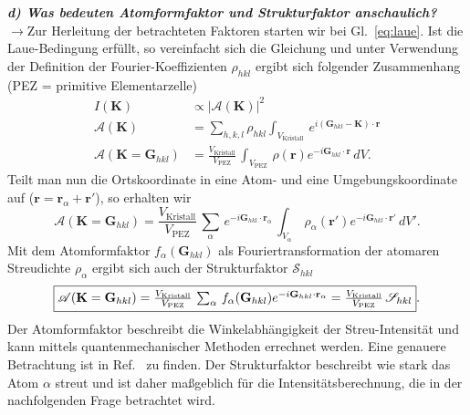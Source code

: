 \textbf{\textit{d) Was bedeuten Atomformfaktor und Strukturfaktor anschaulich?}}\\
$\rightarrow$Zur Herleitung der betrachteten Faktoren starten wir bei Gl.~\eqref{eq:laue}. 
Ist die Laue-Bedingung erfüllt, so vereinfacht sich die Gleichung und unter Verwendung der Definition 
der Fourier-Koeffizienten $\rho_{hkl}$ ergibt sich folgender Zusammenhang (PEZ = primitive Elementarzelle) \cite{EPC}
\begin{align}
    I(\mathbf{K}) &\propto \left\vert\mathscr{A}(\mathbf{K})\right\vert^{2} \\
    \mathscr{A}(\mathbf{K}) &= \sum_{h,k,l}\rho_{hkl}\int_{V_{\text{Kristall}}}\,e^{i(\mathbf{G}_{hkl}-\mathbf{K})\cdot\mathbf{r}} \\
    \mathscr{A}(\mathbf{K} = \mathbf{G}_{hkl}) &= \frac{V_{\text{Kristall}}}{V_{\text{PEZ}}}\,\int_{V_{\text{PEZ}}}\,\rho(\mathbf{r})e^{-i \mathbf{G}_{hkl}\cdot \mathbf{r}}\,dV.
\end{align}
Teilt man nun die Ortskoordinate in eine Atom- und eine Umgebungskoordinate auf ($\mathbf{r} = \mathbf{r}_{\alpha} + \mathbf{r'}$), 
so erhalten wir
\begin{equation}
    \mathscr{A}(\mathbf{K} = \mathbf{G}_{hkl}) = \frac{V_{\text{Kristall}}}{V_{\text{PEZ}}}\,\sum_{\alpha}\,e^{-i \mathbf{G}_{hkl}\cdot \mathbf{r}_{\alpha}}\,\int_{V_{\alpha}}\,\rho_{\alpha}(\mathbf{r'})e^{-i \mathbf{G}_{hkl}\cdot \mathbf{r'}}\,dV'.
\end{equation} 
Mit dem Atomformfaktor $f_{\alpha}(\mathbf{G}_{hkl})$ als Fouriertransformation der atomaren Streudichte $\rho_{\alpha}$ ergibt 
sich auch der Strukturfaktor $\mathscr{S}_{hkl}$
\begin{equation}
    \fbox{$\mathscr{A}(\mathbf{K} = \mathbf{G}_{hkl}) = \frac{V_{\text{Kristall}}}{V_{\text{PEZ}}}\,\sum_{\alpha}\,f_{\alpha}(\mathbf{G}_{hkl})e^{-i \mathbf{G}_{hkl}\cdot \mathbf{r}_{\alpha}}
    = \frac{V_{\text{Kristall}}}{V_{\text{PEZ}}}\,\mathscr{S}_{hkl}$}.
\end{equation}
Der Atomformfaktor beschreibt die Winkelabhängigkeit der Streu-Intensität und kann mittels quantenmechanischer Methoden 
errechnet werden. Eine genauere Betrachtung ist in Ref.~\cite{Kristall} zu finden. 
Der Strukturfaktor beschreibt wie stark das Atom $\alpha$ streut und ist daher maßgeblich für die Intensitätsberechnung, die in 
der nachfolgenden Frage betrachtet wird. \\   


